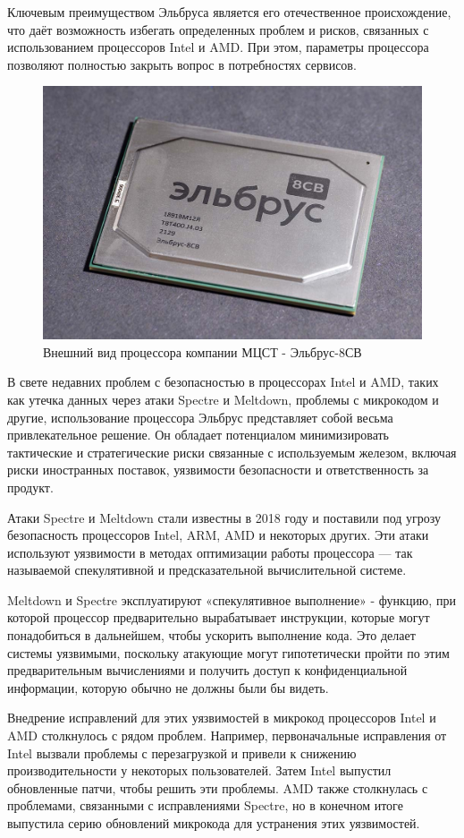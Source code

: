 Ключевым преимуществом Эльбруса является его отечественное происхождение, что даёт возможность избегать определенных проблем и рисков, связанных с использованием процессоров Intel и AMD. При этом, параметры процессора позволяют полностью закрыть вопрос в потребностях сервисов.

\begin{figure}
  \centering
  \includegraphics[width=.6\textwidth]{graphics/img/elbrus}
  \caption{Внешний вид процессора компании МЦСТ - Эльбрус-8СВ}
  \label{fig:elbrus}
\end{figure}

В свете недавних проблем с безопасностью в процессорах Intel и AMD, таких как утечка данных через атаки Spectre и Meltdown, проблемы с микрокодом и другие, использование процессора Эльбрус представляет собой весьма привлекательное решение. Он обладает потенциалом минимизировать тактические и стратегические риски связанные с используемым железом, включая риски иностранных поставок, уязвимости безопасности и ответственность за продукт.

Атаки Spectre и Meltdown стали известны в 2018 году и поставили под угрозу безопасность процессоров Intel, ARM, AMD и некоторых других. Эти атаки используют уязвимости в методах оптимизации работы процессора — так называемой спекулятивной и предсказательной вычислительной системе.

Meltdown и Spectre эксплуатируют «спекулятивное выполнение» \cite{risk:spectual_hack} - функцию, при которой процессор предварительно вырабатывает инструкции, которые могут понадобиться в дальнейшем, чтобы ускорить выполнение кода. Это делает системы уязвимыми, поскольку атакующие могут гипотетически пройти по этим предварительным вычислениями и получить доступ к конфиденциальной информации, которую обычно не должны были бы видеть.

Внедрение исправлений для этих уязвимостей в микрокод процессоров Intel и AMD столкнулось с рядом проблем. Например, первоначальные исправления от Intel вызвали проблемы с перезагрузкой и привели к снижению производительности у некоторых пользователей. Затем Intel выпустил обновленные патчи, чтобы решить эти проблемы. AMD также столкнулась с проблемами, связанными с исправлениями Spectre, но в конечном итоге выпустила серию обновлений микрокода для устранения этих уязвимостей.


